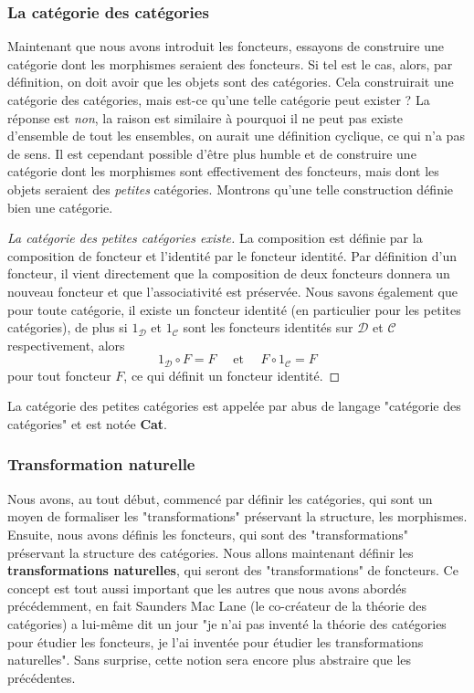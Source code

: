 \documentclass{article}
\begin{document}
\subsubsection{La catégorie des catégories}
Maintenant que nous avons introduit les foncteurs, essayons de construire une catégorie dont les morphismes seraient des foncteurs. Si tel est le cas, alors, par définition, on doit avoir que les objets sont des catégories. Cela construirait une catégorie des catégories, mais est-ce qu'une telle catégorie peut exister ? La réponse est \textit{non}, la raison est similaire à pourquoi il ne peut pas existe d'ensemble de tout les ensembles, on aurait une définition cyclique, ce qui n'a pas de sens. Il est cependant possible d'être plus humble et de construire une catégorie dont les morphismes sont effectivement des foncteurs, mais dont les objets seraient des \textit{petites} catégories. Montrons qu'une telle construction définie bien une catégorie.

\begin{proof}[La catégorie des petites catégories existe]{}
    La composition est définie par la composition de foncteur et l'identité par le foncteur identité. Par définition d'un foncteur, il vient directement que la composition de deux foncteurs donnera un nouveau foncteur et que l'associativité est préservée. Nous savons également que pour toute catégorie, il existe un foncteur identité (en particulier pour les petites catégories), de plus si $1_\mathcal D$ et $1_\mathcal C$ sont les foncteurs identités sur $\mathcal D$ et $\mathcal C$ respectivement, alors $$1_\mathcal D\circ F=F\quad\text{ et }\quad F\circ 1_\mathcal C=F$$ pour tout foncteur $F$, ce qui définit un foncteur identité.
\end{proof}

\noindent
La catégorie des petites catégories est appelée par abus de langage "catégorie des catégories" et est notée \textbf{Cat}.

\subsubsection{Transformation naturelle}
Nous avons, au tout début, commencé par définir les catégories, qui sont un moyen de formaliser les "transformations" préservant la structure, les morphismes. Ensuite, nous avons définis les foncteurs, qui sont des "transformations" préservant la structure des catégories. Nous allons maintenant définir les \textbf{transformations naturelles}, qui seront des "transformations" de foncteurs. Ce concept est tout aussi important que les autres que nous avons abordés précédemment, en fait Saunders Mac Lane (le co-créateur de la théorie des catégories) a lui-même dit un jour "je n'ai pas inventé la théorie des catégories pour étudier les foncteurs, je l'ai inventée pour étudier les transformations naturelles". Sans surprise, cette notion sera encore plus abstraire que les précédentes.\\
\end{document}
